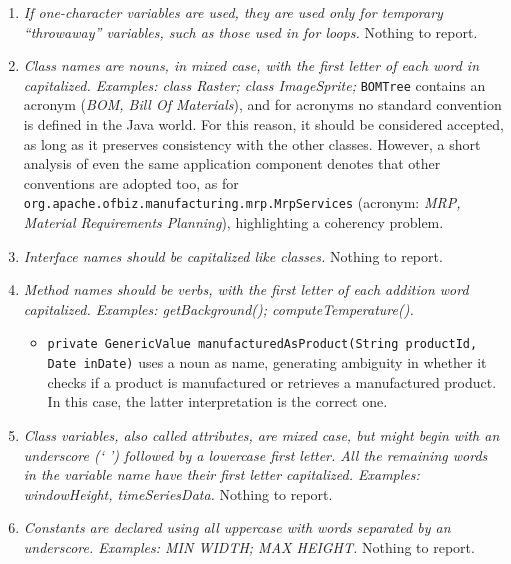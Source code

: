 \begin{enumerate}
			\item \textit{If one-character variables are used, they are used only for temporary “throwaway” variables, such as those used in for loops.}\newline
			Nothing to report. %

			\item \textit{Class names are nouns, in mixed case, with the first letter of each word in capitalized. Examples: class Raster; class ImageSprite;}\newline
			\texttt{BOMTree} contains an acronym (\textit{BOM, Bill Of Materials}), and for acronyms no standard convention is defined in the Java world. For this reason, it should be considered accepted, as long as it preserves consistency with the other classes. However, a short analysis of even the same application component denotes that other conventions are adopted too, as for \texttt{org.apache.ofbiz.manufacturing.mrp.MrpServices} (acronym: \textit{MRP, Material Requirements Planning}), highlighting a coherency problem.

			\item \textit{Interface names should be capitalized like classes.}\newline
			Nothing to report. %
			\item \textit{Method names should be verbs, with the first letter of each addition word capitalized. Examples: getBackground(); computeTemperature().}\newline
			\begin{itemize}
				\item \texttt{private GenericValue manufacturedAsProduct(String productId, Date inDate)}\newline
				uses a noun as name, generating ambiguity in whether it checks if a product is manufactured or retrieves a manufactured product. In this case, the latter interpretation is the correct one.
			\end{itemize}

			\item \textit{Class variables, also called attributes, are mixed case, but might begin with an underscore (‘ ’) followed by a lowercase first letter. All the remaining words in the variable name have their first letter capitalized. Examples: windowHeight, timeSeriesData.}\newline
			Nothing to report. %

			\item \textit{Constants are declared using all uppercase with words separated by an underscore. Examples: MIN WIDTH; MAX HEIGHT.}\newline
			Nothing to report. %
		\end{enumerate}

